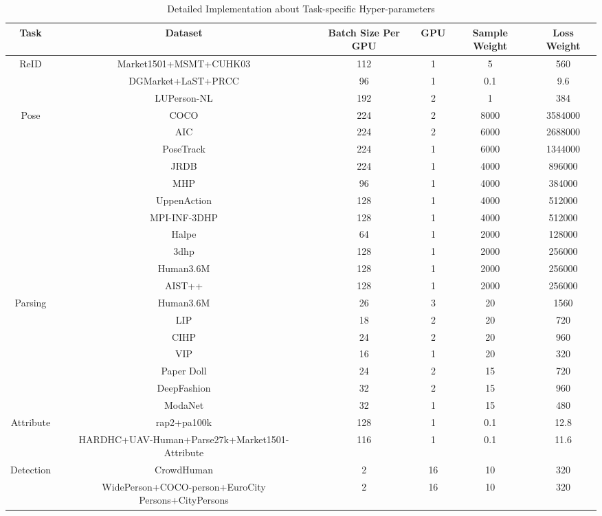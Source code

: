 \documentclass[10pt,twocolumn,letterpaper]{article}
\begin{document}
\begin{table*}[t]
\footnotesize
  \centering
  \caption{Detailed Implementation about Task-specific Hyper-parameters}
    \begin{tabular}{cccccc}
    \hline
    Task  & Dataset & Batch Size Per GPU & GPU   & Sample Weight & Loss Weight \\
    \midrule
    \multirow{3}[2]{*}{ReID} & Market1501+MSMT+CUHK03 & 112   & 1     & 5     & 560 \\
          & DGMarket+LaST+PRCC & 96    & 1     & 0.1   & 9.6 \\
          & LUPerson-NL & 192   & 2     & 1     & 384 \\
    \midrule
    \multirow{11}[2]{*}{Pose} & COCO  & 224   & 2     & 8000  & 3584000 \\
          & AIC   & 224   & 2     & 6000  & 2688000 \\
          & PoseTrack & 224   & 1     & 6000  & 1344000 \\
          & JRDB & 224   & 1     & 4000  & 896000 \\
          & MHP   & 96    & 1     & 4000  & 384000 \\
          & UppenAction & 128   & 1     & 4000  & 512000 \\
          & MPI-INF-3DHP  & 128   & 1     & 4000  & 512000 \\
          & Halpe & 64    & 1     & 2000  & 128000 \\
          & 3dhp  & 128   & 1     & 2000  & 256000 \\
          & Human3.6M  & 128   & 1     & 2000  & 256000 \\
          & AIST++  & 128   & 1     & 2000  & 256000 \\
    \midrule
    \multirow{7}[2]{*}{Parsing} & Human3.6M  & 26    & 3     & 20    & 1560 \\
          & LIP   & 18    & 2     & 20    & 720 \\
          & CIHP  & 24    & 2     & 20    & 960 \\
          & VIP   & 16    & 1     & 20    & 320 \\
          & Paper Doll & 24    & 2     & 15    & 720 \\
          & DeepFashion & 32    & 2     & 15    & 960 \\
          & ModaNet & 32    & 1     & 15    & 480 \\
    \midrule
    \multirow{2}[2]{*}{Attribute} & rap2+pa100k & 128   & 1     & 0.1   & 12.8 \\
          & HARDHC+UAV-Human+Parse27k+Market1501-Attribute & 116   & 1     & 0.1   & 11.6 \\
    \midrule
    \multirow{2}[2]{*}{Detection} & CrowdHuman & 2     & 16    & 10    & 320 \\
          & WidePerson+COCO-person+EuroCity Persons+CityPersons & 2     & 16    & 10    & 320 \\
    \bottomrule
    \end{tabular}\label{tab:task_specific}\end{table*}
\end{document}
